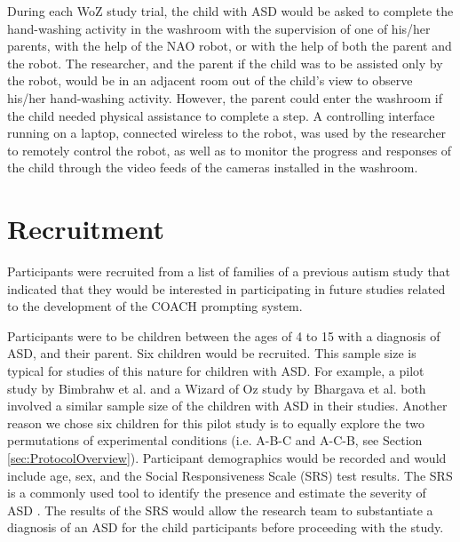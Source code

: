\documentclass{ut-thesis}
\begin{document}
During each WoZ study trial, the child with ASD would be asked to complete the hand-washing activity in the washroom with the supervision of one of his/her parents, with the help of the NAO robot, or with the help of both the parent and the robot. The researcher, and the parent if the child was to be assisted only by the robot, would be in an adjacent room out of the child's view to observe his/her hand-washing activity.  However, the parent could enter the washroom if the child needed physical assistance to complete a step. A controlling interface running on a laptop, connected wireless to the robot, was used by the researcher to remotely control the robot, as well as to monitor the progress and responses of the child through the video feeds of the cameras installed in the washroom.


\section{Recruitment}

Participants were recruited from a list of families of a previous autism study that indicated that they would be interested in participating in future studies related to the development of the COACH prompting system.

Participants were to be children between the ages of 4 to 15 with a diagnosis of ASD, and their parent. Six children would be recruited. This sample size is typical for studies of this nature for children with ASD. For example, a pilot study by Bimbrahw et al. \cite{bimbrahw2012investigating} and a Wizard of Oz study by Bhargava et al. \cite{bhargava2013demonstration} both involved a similar sample size of the children with ASD in their studies. Another reason we chose six children for this pilot study is to equally explore the two permutations of experimental conditions (i.e. A-B-C and A-C-B, see Section \ref{sec:ProtocolOverview}). Participant demographics would be recorded and would include age, sex, and the Social Responsiveness Scale (SRS) test results.  The SRS is a commonly used tool to identify the presence and estimate the severity of ASD \cite{constantino2002social}. The results of the SRS would allow the research team to substantiate a diagnosis of an ASD for the child participants before proceeding with the study.
\end{document}
